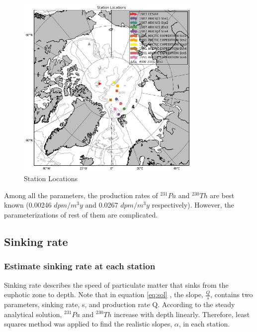 \documentclass[paper=a4, fontsize=11pt]{scrartcl} %
\numberwithin{equation}{section} %
\numberwithin{figure}{section} %
\numberwithin{table}{section} %
\begin{document}
\begin{figure}[h]
\centering
\includegraphics[width=21pc]{Figures/map.pdf}
\caption{Station Locations}
 \label{fig:map}
\end{figure}

Among all the parameters, the production rates of $^{231}Pa$ and $^{230}Th$ are best known (0.00246  $dpm/m^{3}y$ and 0.0267 $dpm/m^{3}y$ respectively). However, the parameterizations of rest of them are complicated.

\subsection{Sinking rate}
\subsubsection{Estimate sinking rate at each station}

Sinking rate describes the speed of particulate matter that sinks from the euphotic zone to depth. Note that in equation \ref{eq:sol} , the slope, $\frac{Q}{s}$, contains two parameters, sinking rate, s, and production rate Q. According to the steady analytical solution, $^{231}Pa$ and $^{230}Th$ increase with depth linearly. Therefore, least squares method was applied to find the realistic slopes, $\alpha$, in each station. 
\end{document}
